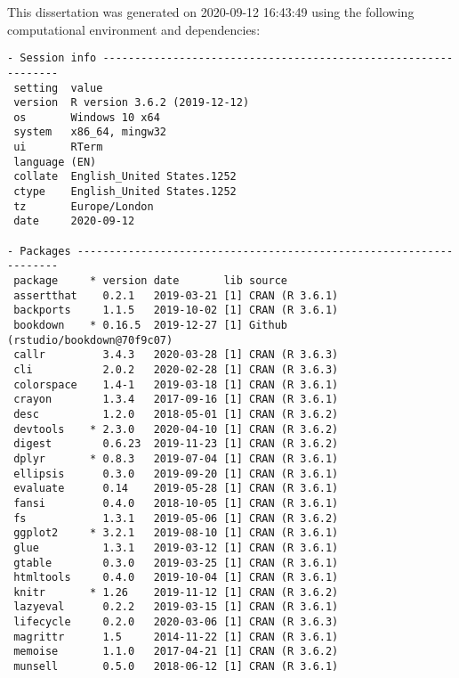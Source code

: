 \documentclass[12pt,twoside]{reedthesis}
\begin{document}
This dissertation was generated on 2020-09-12 16:43:49 using the following computational environment and dependencies:
\begin{verbatim}
- Session info ---------------------------------------------------------------
 setting  value                       
 version  R version 3.6.2 (2019-12-12)
 os       Windows 10 x64              
 system   x86_64, mingw32             
 ui       RTerm                       
 language (EN)                        
 collate  English_United States.1252  
 ctype    English_United States.1252  
 tz       Europe/London               
 date     2020-09-12                  

- Packages -------------------------------------------------------------------
 package     * version date       lib source                            
 assertthat    0.2.1   2019-03-21 [1] CRAN (R 3.6.1)                    
 backports     1.1.5   2019-10-02 [1] CRAN (R 3.6.1)                    
 bookdown    * 0.16.5  2019-12-27 [1] Github (rstudio/bookdown@70f9c07) 
 callr         3.4.3   2020-03-28 [1] CRAN (R 3.6.3)                    
 cli           2.0.2   2020-02-28 [1] CRAN (R 3.6.3)                    
 colorspace    1.4-1   2019-03-18 [1] CRAN (R 3.6.1)                    
 crayon        1.3.4   2017-09-16 [1] CRAN (R 3.6.1)                    
 desc          1.2.0   2018-05-01 [1] CRAN (R 3.6.2)                    
 devtools    * 2.3.0   2020-04-10 [1] CRAN (R 3.6.2)                    
 digest        0.6.23  2019-11-23 [1] CRAN (R 3.6.2)                    
 dplyr       * 0.8.3   2019-07-04 [1] CRAN (R 3.6.1)                    
 ellipsis      0.3.0   2019-09-20 [1] CRAN (R 3.6.1)                    
 evaluate      0.14    2019-05-28 [1] CRAN (R 3.6.1)                    
 fansi         0.4.0   2018-10-05 [1] CRAN (R 3.6.1)                    
 fs            1.3.1   2019-05-06 [1] CRAN (R 3.6.2)                    
 ggplot2     * 3.2.1   2019-08-10 [1] CRAN (R 3.6.1)                    
 glue          1.3.1   2019-03-12 [1] CRAN (R 3.6.1)                    
 gtable        0.3.0   2019-03-25 [1] CRAN (R 3.6.1)                    
 htmltools     0.4.0   2019-10-04 [1] CRAN (R 3.6.1)                    
 knitr       * 1.26    2019-11-12 [1] CRAN (R 3.6.2)                    
 lazyeval      0.2.2   2019-03-15 [1] CRAN (R 3.6.1)                    
 lifecycle     0.2.0   2020-03-06 [1] CRAN (R 3.6.3)                    
 magrittr      1.5     2014-11-22 [1] CRAN (R 3.6.1)                    
 memoise       1.1.0   2017-04-21 [1] CRAN (R 3.6.2)                    
 munsell       0.5.0   2018-06-12 [1] CRAN (R 3.6.1)                    

\end{verbatim}
\end{document}
